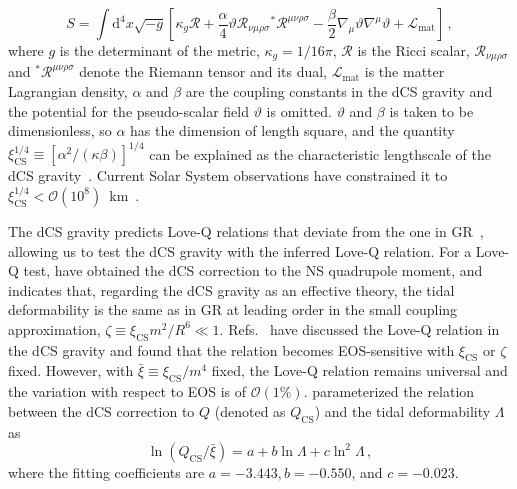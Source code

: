 \documentclass[a4paper,11pt]{article}
\begin{document}
\begin{equation}
   \label{cs_action}
   S = \int \mathrm{d}^4 x \sqrt{-g}\left[ \kappa_g \mathcal{R} +
   \frac{\alpha}{4} \mathcal{\vartheta} \mathcal{R}_{\nu\mu\rho\sigma}
   {}^{*}\mathcal{R}^{\mu\nu\rho\sigma} -
   \frac{\beta}{2}\nabla_{\mu}\mathcal{\vartheta}\nabla^{\mu}\mathcal{\vartheta}
   + \mathcal{L}_{\mathrm{mat}}\right]\,,
\end{equation}
where $g$ is the determinant of the metric, $\kappa_g= 1/16\pi$, $\mathcal{R}$
is the Ricci scalar, $\mathcal{R}_{\nu\mu\rho\sigma}$ and
$^{*}\mathcal{R}^{\mu\nu\rho\sigma}$ denote the Riemann tensor and its dual, 
$\mathcal{L}_{\mathrm{mat}}$ is the matter Lagrangian density, $\alpha$ and
$\beta$ are the coupling constants in the dCS gravity and the potential for the
pseudo-scalar field $\mathcal{\vartheta}$ is omitted.  $\mathcal{\vartheta}$ and
$\beta$ is taken to be dimensionless, so $\alpha$ has the dimension of length
square, and the quantity $\xi_{\mathrm{CS}}^{1/4} \equiv [\alpha^2/
(\kappa\beta)]^{1/4}$ can be explained as the characteristic lengthscale of the
dCS gravity~\cite{Yunes:2009hc, Yagi:2012ya}.  Current Solar System observations
have constrained it to $\xi_{\mathrm{CS}}^{1/4} <\mathcal{O}(10^8
)$~km~\cite{Ali-Haimoud:2011zme, Yagi:2012ya}.

The dCS gravity predicts Love-Q relations that deviate from the one in
GR~\cite{Yagi:2013bca, Yagi:2013awa, Gupta:2017vsl}, allowing us to test the dCS
gravity with the inferred Love-Q relation.  For a Love-Q test,
\citet{Yagi:2013mbt} have obtained the dCS correction to the NS quadrupole
moment, and \citet{Yagi:2011xp} indicates that, regarding the dCS gravity as an
effective theory, the tidal deformability is the same as  in GR at leading order
in the small coupling approximation, $\zeta \equiv \xi_{\mathrm{CS}} m^2/R^6 \ll
1$. Refs.~\cite{Yagi_2017, Yagi:2013mbt, Gupta:2017vsl} have discussed the
Love-Q relation in the dCS gravity and found that the relation becomes
EOS-sensitive with $\xi_{\mathrm{CS}}$ or $\zeta$ fixed. However, with 
$\bar{\xi}\equiv \xi_{\mathrm{CS}}/m^4$ fixed, the Love-Q relation remains 
universal and the  variation with respect to EOS is of $\mathcal{O}(1\%)$.
\citet{Gupta:2017vsl} parameterized the relation between the dCS correction to
$Q$ (denoted as $Q_{\mathrm{CS}}$) and the tidal deformability $\Lambda$ as
\begin{equation}
    \label{cs_Love_Q_eq}
    \ln (Q_{\mathrm{CS}}/\bar{\xi}) = a + b \ln \Lambda + c \ln^{2} \Lambda \,,
\end{equation} 
where the fitting coefficients are $a=-3.443, b=-0.550$, and $c=-0.023$. 
\end{document}
